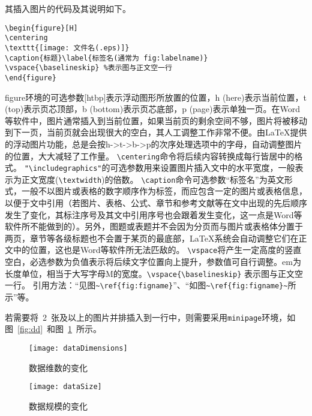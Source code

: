 其插入图片的代码及其说明如下。

\lstset{language=tex,tabsize=4}
\begin{lstlisting}
\begin{figure}[H]
\centering
\texttt{[image: 文件名(.eps)]}
\caption{标题}\label{标签名(通常为 fig:labelname)}
\vspace{\baselineskip} %表示图与正文空一行
\end{figure}
\end{lstlisting}




figure环境的可选参数[htbp]表示浮动图形所放置的位置，h (here)表示当前位置，t (top)表示页芯顶部，b (bottom)表示页芯底部，p (page)表示单独一页。在Word等软件中，图片通常插入到当前位置，如果当前页的剩余空间不够，图片将被移动到下一页，当前页就会出现很大的空白，其人工调整工作非常不便。由LaTeX提供的浮动图片功能，总是会按h->t->b->p的次序处理选项中的字母，自动调整图片的位置，大大减轻了工作量。
\verb|\centering|命令将后续内容转换成每行皆居中的格式。
\verb|"\includegraphics"|的可选参数用来设置图片插入文中的水平宽度，一般表示为正文宽度(\verb|\textwidth|)的倍数。
\verb|\caption|命令可选参数“标签名”为英文形式，一般不以图片或表格的数字顺序作为标签，而应包含一定的图片或表格信息，以便于文中引用（若图片、表格、公式、章节和参考文献等在文中出现的先后顺序发生了变化，其标注序号及其文中引用序号也会跟着发生变化，这一点是Word等软件所不能做到的）。另外，图题或表题并不会因为分页而与图片或表格体分置于两页，章节等各级标题也不会置于某页的最底部，LaTeX系统会自动调整它们在正文中的位置，这也是Word等软件所无法匹敌的。
\verb|\vspace|将产生一定高度的竖直空白，必选参数为负值表示将后续文字位置向上提升，参数值可自行调整。em为长度单位，相当于大写字母M的宽度。\verb|\vspace{\baselineskip}| 表示图与正文空一行。
引用方法：“见图\verb|~\ref{fig:figname}|”、“如图\verb|~\ref{fig:figname}~|所示”等。



若需要将~2~张及以上的图片并排插入到一行中，则需要采用\verb|minipage|环境，如图~\ref{fig:dd}~和图~\ref{fig:ds}~所示。
\begin{figure}[H]
\centering
\begin{minipage}{0.4\textwidth}
\centering
\texttt{[image: dataDimensions]}
\caption{数据维数的变化}\label{fig:dd}
\end{minipage}
\begin{minipage}{0.4\textwidth}
\centering
\texttt{[image: dataSize]}
\caption{数据规模的变化}\label{fig:ds}
\end{minipage}
\vspace{\baselineskip}
\end{figure}

